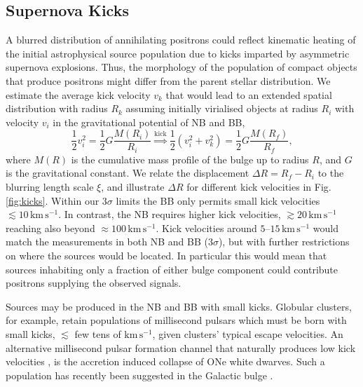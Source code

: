 \documentclass[doublespace,nopageskip]{VTthesis}
\begin{document}
\subsection{Supernova Kicks}\label{sec:pulsar_kicks}
%
A blurred distribution of annihilating positrons could reflect kinematic heating of the initial astrophysical source population due to kicks imparted by asymmetric supernova explosions.
%
Thus, the morphology of the population of compact objects that produce positrons might differ from the parent stellar distribution.
%
We estimate the average kick velocity $v_k$ that would lead to an extended spatial distribution with radius $R_k$ assuming initially virialised objects at radius $R_i$ with velocity $v_i$ in the gravitational potential of NB and BB,
%
\begin{equation}
	\frac{1}{2}v_i^2 = \frac{1}{2} G \frac{M(R_i)}{R_i} \stackrel{\mathrm{kick}}{\Longrightarrow} \frac{1}{2}(v_i^2 + v_k^2) = \frac{1}{2} G \frac{M(R_f)}{R_f} \mathrm{,}
	\label{eq:virial_init}
\end{equation}
%
\noindent where $M(R)$ is the cumulative mass profile of the bulge up to radius $R$, and $G$ is the gravitational constant.
%
We relate the displacement $\Delta R = R_f - R_i$ to the blurring length scale $\xi$, and illustrate $\Delta R$ for different kick velocities in Fig.\,\ref{fig:kicks}.
%
Within our $3\sigma$ limits the BB only permits small kick velocities $\lesssim 10\,\mathrm{km\,s^{-1}}$.
%
In contrast, the NB requires higher kick velocities, $\gtrsim 20\,\mathrm{km\,s^{-1}}$ reaching also beyond $\approx 100\,\mathrm{km\,s^{-1}}$. 
%
Kick velocities around $5$--$15\,\mathrm{km\,s^{-1}}$ would match the measurements in both NB and BB ($3\sigma$), but with further restrictions on where the sources would be located.
%
In particular this would mean that sources inhabiting only a fraction of either bulge component could contribute positrons supplying the observed signals.
%

Sources may be produced in the NB and BB with small kicks.
%
Globular clusters, for example, retain populations of millisecond pulsars which must be born with small kicks, $\lesssim$ few tens of $\mathrm{km\,s^{-1}}$, given clusters' typical escape velocities.
%
An alternative millisecond pulsar formation channel 
that naturally produces low kick velocities \citep[$\lesssim 30\,\mathrm{km\,s^{-1}}$,][]{2013A&A...558A..39T}, is
the accretion induced collapse of ONe white dwarves.
%
Such a population has recently been suggested in the Galactic bulge \citep{2021arXiv210600222G}.
%
\end{document}
